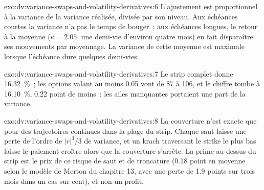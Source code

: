 \begin{solution}{exo:dv:variance-swaps-and-volatility-derivatives:6}
L'ajustement est proportionnel à la variance de la variance réalisée, divisée par son niveau. Aux échéances courtes
la variance n'a pas le temps de bouger~; aux échéances longues, le retour à la moyenne ($\kappa=2.05$, une demi-vie d'environ quatre mois)
en fait disparaître ses mouvements par moyennage. La variance de cette moyenne est maximale lorsque l'échéance dure quelques demi-vies.
\end{solution}

\begin{solution}{exo:dv:variance-swaps-and-volatility-derivatives:7}
Le strip complet donne 16.32~\%~; les options valant au moins 0.05 vont de 87 à 106, et le chiffre tombe à 16.10~\%,
0.22 point de moins~: les ailes manquantes portaient une part de la variance.
\end{solution}

\begin{solution}{exo:dv:variance-swaps-and-volatility-derivatives:8}
La couverture n'est exacte que pour des trajectoires continues dans la plage du strip. Chaque saut laisse une perte de l'ordre de
$|r|^3/3$ de variance, et un krach traversant le strike le plus bas laisse le paiement croître alors que la couverture s'arrête. La
prime au-dessus du strip est le prix de ce risque de saut et de troncature (0.18 point en moyenne selon le modèle de
Merton du chapitre 13, avec une perte de 1.9 points sur trois mois dans un cas sur cent), et non un profit.
\end{solution}

